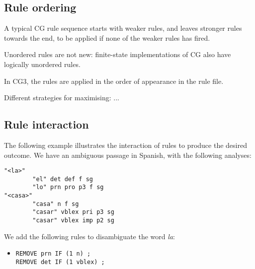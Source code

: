 \documentclass[11pt]{article}
\begin{document}
 


\subsection{Rule ordering}
\label{ssec:ordering}

A typical CG rule sequence starts with weaker rules, and leaves stronger rules towards the end, 
to be applied if none of the weaker rules has fired.

Unordered rules are not new: finite-state implementations of CG \cite{koskenniemi92} also have logically unordered rules. 


In CG3, the rules are applied in the order of appearance in the rule file.


Different strategies for maximising: ...

\subsection{Rule interaction}

The following example illustrates the interaction of rules to produce the desired outcome. We have an ambiguous passage in Spanish, with the following analyses:

\begin{verbatim}
"<la>"
        "el" det def f sg
        "lo" prn pro p3 f sg
"<casa>"
        "casa" n f sg
        "casar" vblex pri p3 sg
        "casar" vblex imp p2 sg
\end{verbatim}

We add the following rules to disambiguate the word \emph{la}:
\begin{itemize}
\item [] \texttt{REMOVE prn IF (1 n) ;} \\
             \texttt{REMOVE det IF (1 vblex) ;}
\end{itemize}
\end{document}

